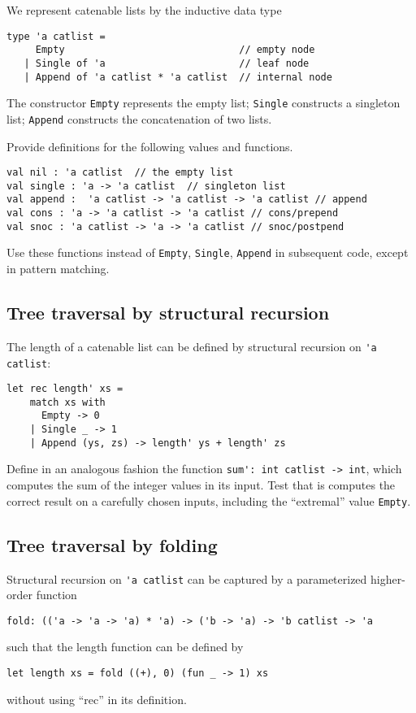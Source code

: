 \documentclass[a4paper,11pt]{article}
\begin{document}
We represent catenable lists by the inductive data type 
\begin{verbatim}
type 'a catlist = 
     Empty                              // empty node
   | Single of 'a                       // leaf node
   | Append of 'a catlist * 'a catlist  // internal node
\end{verbatim}
The constructor \texttt{Empty} represents the empty list; \texttt{Single} constructs a singleton list; \texttt{Append} constructs the concatenation of two lists.

Provide definitions for the following values and functions. 
\begin{verbatim}
val nil : 'a catlist  // the empty list
val single : 'a -> 'a catlist  // singleton list
val append :  'a catlist -> 'a catlist -> 'a catlist // append
val cons : 'a -> 'a catlist -> 'a catlist // cons/prepend
val snoc : 'a catlist -> 'a -> 'a catlist // snoc/postpend
\end{verbatim}
Use these functions instead of \verb|Empty|, \verb|Single|, \verb|Append| in subsequent code, except in pattern matching.

\subsection{Tree traversal by structural recursion}

The length of a catenable list can be defined by structural recursion on \verb|'a catlist|:
\begin{verbatim}
let rec length' xs =
    match xs with
      Empty -> 0
    | Single _ -> 1
    | Append (ys, zs) -> length' ys + length' zs
\end{verbatim}

Define in an analogous fashion the function \verb|sum': int catlist -> int|, which computes the sum of the integer values in its
input. Test that is computes the correct result on a carefully chosen inputs, including the ``extremal'' value \verb|Empty|.

\subsection{Tree traversal by folding}

Structural recursion on \verb|'a catlist| can be captured by a parameterized higher-order function
\begin{verbatim}
fold: (('a -> 'a -> 'a) * 'a) -> ('b -> 'a) -> 'b catlist -> 'a
\end{verbatim}
such that the length function can be defined by
\begin{verbatim}
let length xs = fold ((+), 0) (fun _ -> 1) xs
\end{verbatim}
without using ``rec'' in its definition.
\end{document}
